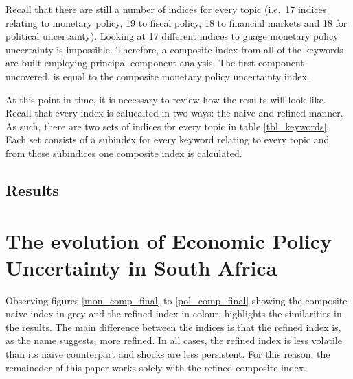 \documentclass[11pt,preprint, authoryear]{elsarticle}
\numberwithin{equation}{section}
\numberwithin{figure}{section}
\numberwithin{table}{section}
\begin{document}
Recall that there are still a number of indices for every topic (i.e.~17
indices relating to monetary policy, 19 to fiscal policy, 18 to
financial markets and 18 for political uncertainty). Looking at 17
different indices to guage monetary policy uncertainty is impossible.
Therefore, a composite index from all of the keywords are built
employing principal component analysis. The first component uncovered,
is equal to the composite monetary policy uncertainty index.

At this point in time, it is necessary to review how the results will
look like. Recall that every index is calucalted in two ways: the naive
and refined manner. As such, there are two sets of indices for every
topic in table \ref{tbl_keywords}. Each set consists of a subindex for
every keyword relating to every topic and from these subindices one
composite index is calculated.

\subsection{\texorpdfstring{Results
\label{sec_results}}{Results }}\label{results}

\section{\texorpdfstring{The evolution of Economic Policy Uncertainty in
South Africa
\label{sec_discuss}}{The evolution of Economic Policy Uncertainty in South Africa }}\label{the-evolution-of-economic-policy-uncertainty-in-south-africa}

Observing figures \ref{mon_comp_final} to \ref{pol_comp_final} showing
the composite naive index in grey and the refined index in colour,
highlights the similarities in the results. The main difference between
the indices is that the refined index is, as the name suggests, more
refined. In all cases, the refined index is less volatile than its naive
counterpart and shocks are less persistent. For this reason, the
remaineder of this paper works solely with the refined composite index.
\end{document}
